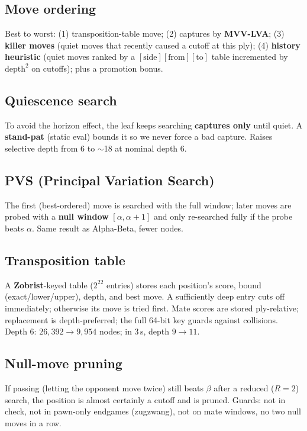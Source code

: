 \documentclass[11pt]{article}
\begin{document}
\subsection{Move ordering}
Best to worst: (1) transposition-table move; (2) captures by \textbf{MVV-LVA};
(3) \textbf{killer moves} (quiet moves that recently caused a cutoff at this
ply); (4) \textbf{history heuristic} (quiet moves ranked by a
$[\text{side}][\text{from}][\text{to}]$ table incremented by $\text{depth}^2$ on
cutoffs); plus a promotion bonus.

\subsection{Quiescence search}
To avoid the horizon effect, the leaf keeps searching \textbf{captures only}
until quiet. A \textbf{stand-pat} (static eval) bounds it so we never force a bad
capture. Raises selective depth from 6 to $\sim$18 at nominal depth 6.

\subsection{PVS (Principal Variation Search)}
The first (best-ordered) move is searched with the full window; later moves are
probed with a \textbf{null window} $[\alpha,\alpha{+}1]$ and only re-searched
fully if the probe beats $\alpha$. Same result as Alpha-Beta, fewer nodes.

\subsection{Transposition table}
A \textbf{Zobrist}-keyed table ($2^{22}$ entries) stores each position's score,
bound (exact/lower/upper), depth, and best move. A sufficiently deep entry cuts
off immediately; otherwise its move is tried first. Mate scores are stored
ply-relative; replacement is depth-preferred; the full 64-bit key guards against
collisions. Depth 6: $26{,}392 \to 9{,}954$ nodes; in 3\,s, depth $9\to 11$.

\subsection{Null-move pruning}
If passing (letting the opponent move twice) still beats $\beta$ after a reduced
($R=2$) search, the position is almost certainly a cutoff and is pruned. Guards:
not in check, not in pawn-only endgames (zugzwang), not on mate windows, no two
null moves in a row.
\end{document}
